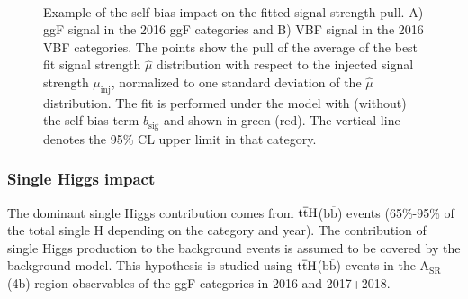 \begin{figure}[ht!]
\captionsetup[subfigure]{justification=centering}
\centering
{}
\\
\caption[Example of the self-bias impact on the fitted signal strength pull]{Example of the self-bias impact on the fitted signal strength pull. A) ggF signal in the 2016 ggF categories and B) VBF signal in the 2016 VBF categories. The points show the pull of the average of the best fit signal strength $\hat{\mu}$ distribution with respect to the injected signal strength $\mu_\text{inj}$, normalized to one standard deviation of the $\hat{\mu}$ distribution. The fit is performed under the model with (without) the self-bias term $b_\text{sig}$ and shown in green (red). The vertical line denotes the 95\% CL upper limit in that category.}
\label{fig:bkg:self-bias-pull}
\end{figure}

\subsubsection{Single Higgs impact}
The dominant single Higgs contribution comes from $\mathrm{t\overline{t}H}$($\mathrm{b\overline{b}}$) events (65\%-95\% of the total single H depending on the category and year). The contribution of single Higgs production to the background events is assumed to be covered by the background model. This hypothesis is studied using $\mathrm{t\overline{t}H}$($\mathrm{b\overline{b}}$) events in the $\mathrm{A_{SR}}$(4b) region observables of the ggF categories in 2016 and 2017+2018. 

